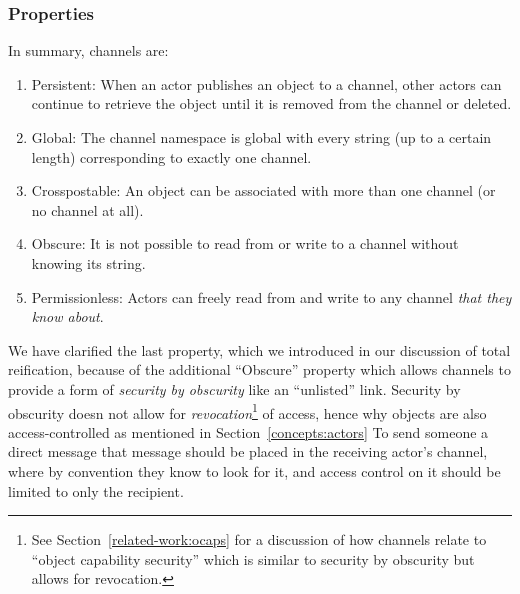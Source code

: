 





\subsubsection{Properties}

In summary, channels are:

\begin{enumerate}
\item
Persistent: When an actor publishes an object to a channel, other actors can
continue to retrieve the object until it is removed from the channel or deleted.
\item
Global: The channel namespace is global with every string (up to a certain length)
corresponding to exactly one channel.
\item
Crosspostable: An object can be associated with more than one channel (or no channel at all).
\item
Obscure: It is not possible to read from or write to a channel without knowing
its string.
\item
Permissionless: Actors can freely read from and write to any channel \emph{that they know about}.
\end{enumerate}

We have clarified the last property, which we introduced in our discussion of
total reification, because of the additional ``Obscure'' property
which allows channels to provide a form of \emph{security by obscurity} like an ``unlisted'' link.
Security by obscurity doesn not allow for \emph{revocation}\footnote{
    See Section~\ref{related-work:ocaps} for a discussion of how channels relate to ``object capability security''
    which is similar to security by obscurity but allows for revocation.
}
of access,
hence why objects are also access-controlled as mentioned in Section~\ref{concepts:actors}
To send someone a direct message that message should be placed in
the receiving actor's channel, where by convention they know to look for it,
and access control on it should be limited to only the recipient.

